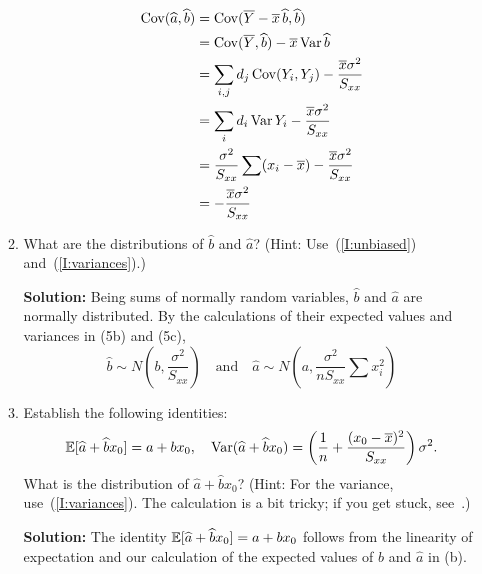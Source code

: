 \documentclass[12pt]{amsart}
\newcommand{\sol}{\bigskip\noindent\textbf{Solution: }}
\begin{document}
\begin{enumerate}
\begin{enumerate}
        \begin{align*}
            \operatorname{Cov}(\widehat a, \widehat b) &= \operatorname{Cov}(\overline Y - \overline x\,\widehat b, \widehat b)\\
            &= \operatorname{Cov}(\overline Y, \widehat b) - \overline x\operatorname{Var} \widehat b\\
            &= \sum_{i,j}d_j\operatorname{Cov}(Y_i, Y_j) - \frac{\overline x \sigma^2}{S_{xx}}\\
            &= \sum_i d_i\operatorname{Var} Y_i - \frac{\overline x \sigma^2}{S_{xx}}\\
            &= \frac{\sigma^2}{S_{xx}}\sum(x_i - \overline x) - \frac{\overline x \sigma^2}{S_{xx}}\\
            &= - \frac{\overline x \sigma^2}{S_{xx}}
        \end{align*}

        \item What are the distributions of $\hat b$ and $\hat a$? (Hint: Use~(\ref{I:unbiased}) and~(\ref{I:variances}).)
        
        \sol
        Being sums of normally random variables, $\hat b$ and $\hat a$ are normally distributed.
        By the calculations of their expected values and variances in (5b) and (5c),
        \[
            \hat b\sim N\left(b, \frac{\sigma^2}{S_{xx}}\right)
            \quad\text{and}\quad
            \hat a\sim N\left(a, \frac{\sigma^2}{nS_{xx}}\sum x_i^2\right)
        \]
        
        \item Establish the following identities:
        \[
            \operatorname{\mathbb{E}}[\widehat a + \widehat b x_0]=a + bx_0,\quad \operatorname{Var}(\widehat a + \widehat b x_0) = \left(\frac1n + \frac{(x_0-\overline x)^2}{S_{xx}} \right)\sigma^2.
        \]
        What is the distribution of $\hat a + \hat b x_0$?
        (Hint: For the variance, use~(\ref{I:variances}). The calculation is a bit tricky; if you get stuck, see~\cite[\S11.3.5]{CB}.)

        \sol
        The identity $\operatorname{\mathbb{E}}[\widehat a + \widehat b x_0]=a + bx_0$ follows from the linearity of expectation
        and our calculation of the expected values of $\hat b$ and $\hat a$ in (b).


\end{enumerate}
\end{enumerate}
\end{document}
